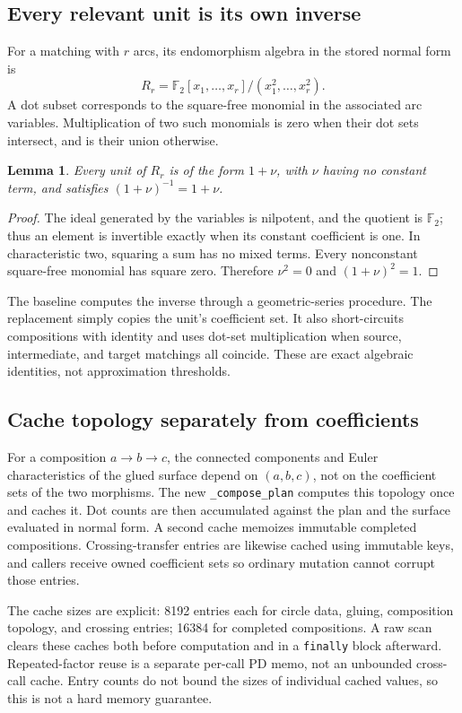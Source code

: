 \documentclass[11pt,letterpaper]{article}
\newtheorem{lemma}[theorem]{Lemma}
\theoremstyle{definition}
\newcommand{\F}{\mathbb F_2}
\begin{document}
\subsection{Every relevant unit is its own inverse}

For a matching with $r$ arcs, its endomorphism algebra in the stored normal form
is
\[
 R_r=\F[x_1,\ldots,x_r]/(x_1^2,\ldots,x_r^2).
\]
A dot subset corresponds to the square-free monomial in the associated arc
variables. Multiplication of two such monomials is zero when their dot sets
intersect, and is their union otherwise.

\begin{lemma}\label{lem:unit}
Every unit of $R_r$ is of the form $1+\nu$, with $\nu$ having no constant term,
and satisfies $(1+\nu)^{-1}=1+\nu$.
\end{lemma}
\begin{proof}
The ideal generated by the variables is nilpotent, and the quotient is $\F$;
thus an element is invertible exactly when its constant coefficient is one.
In characteristic two, squaring a sum has no mixed terms. Every nonconstant
square-free monomial has square zero. Therefore $\nu^2=0$ and
$(1+\nu)^2=1$.
\end{proof}

The baseline computes the inverse through a geometric-series procedure. The
replacement simply copies the unit's coefficient set. It also short-circuits
compositions with identity and uses dot-set multiplication when source,
intermediate, and target matchings all coincide. These are exact algebraic
identities, not approximation thresholds.

\subsection{Cache topology separately from coefficients}

For a composition $a\to b\to c$, the connected components and Euler
characteristics of the glued surface depend on $(a,b,c)$, not on the coefficient
sets of the two morphisms. The new \texttt{\_compose\_plan} computes this topology
once and caches it. Dot counts are then accumulated against the plan and the
surface evaluated in normal form. A second cache memoizes immutable completed
compositions. Crossing-transfer entries are likewise cached using immutable
keys, and callers receive owned coefficient sets so ordinary mutation cannot
corrupt those entries.

The cache sizes are explicit: 8192 entries each for circle data, gluing,
composition topology, and crossing entries; 16384 for completed compositions.
A raw scan clears these caches both before computation and in a
\texttt{finally} block afterward. Repeated-factor reuse is a separate per-call
PD memo, not an unbounded cross-call cache. Entry counts do not bound the sizes
of individual cached values, so this is not a hard memory guarantee.
\end{document}
